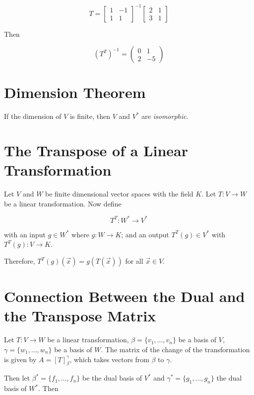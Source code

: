 \[
    T =
    \begin{bmatrix}
        1 & -1 \\
        1 & 1
    \end{bmatrix}^{-1}
    \begin{bmatrix}
        2 & 1 \\
        3 & 1
    \end{bmatrix}
\]

Then

\[
    (T^T)^{-1} =
    \begin{pmatrix}
        0 & 1  \\
        2 & -5
    \end{pmatrix}
\]

\section{Dimension Theorem}

If the dimension of \(V\) is finite, then \(V\) and \(V^*\) are \emph{isomorphic}.

\section{The Transpose of a Linear Transformation}

Let \(V\) and \(W\) be finite dimensional vector spaces with the field \(K\).
Let \(T: V \to W\) be a linear transformation. Now define

\[
    T^T : W^* \to V^*
\]

with an input \(g \in W^*\) where \(g: W \to K\); and an output \(T^T(g) \in V^*\) with
\(T^T(g): V \to K\).

Therefore, \(T^T(g)(\vec{x}) = g (T(\vec{x}))\) for all \(\vec{x} \in V\).

\section{Connection Between the Dual and the Transpose Matrix}

Let \(T: V \to W\) be a linear transformation, \(\beta = \{v_1, \dots, v_n\}\)
be a basis of \(V\),  \(\gamma = \{w_1, \dots, w_n\}\) be a basis of \(W\). The matrix of the
change of the transformation is given by \(A = [T]_{\beta}^{\gamma}\), which takes vectors from \(\beta\)
to \(\gamma\).

Then let \(\beta^* = \{f_1, \dots, f_n\} \) be the dual basis of \(V^*\) and \(\gamma^* = \{g_1, \dots, g_n\}\) the dual basis
of \(W^*\). Then

